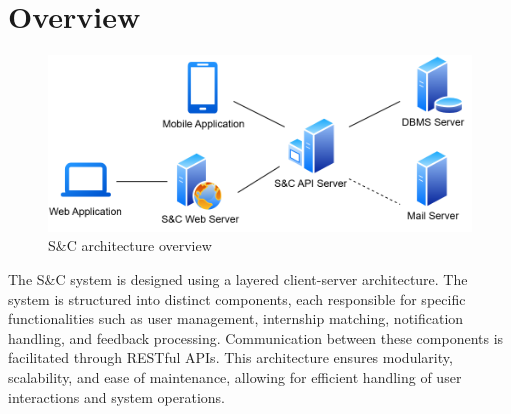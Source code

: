 \section{Overview}
\label{sec:overview}

\begin{figure}[H]
    \centering
    \includegraphics[width=0.9\linewidth]{Images/Architecture design/architecture.png}
    \caption{S\&C architecture overview}
    \label{fig:enter-label}
\end{figure}

The S\&C system is designed using a layered client-server architecture. The system is structured into distinct components, each responsible for specific functionalities such as user management, internship matching, notification handling, and feedback processing. Communication between these components is facilitated through RESTful APIs. This architecture ensures modularity, scalability, and ease of maintenance, allowing for efficient handling of user interactions and system operations.


